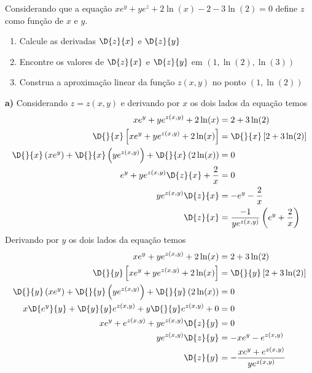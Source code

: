 \documentclass[a4paper,12pt,fleqn]{article}
\begin{document}

Considerando que a equação
\(
  xe^y + ye^z + 2\ln(x) -2 -3\ln(2) = 0
\)
define $z$ como função de $x$ e $y$.
\begin{enumerate}[label=\alph*)]
  \item Calcule as derivadas \(\D{z}{x}\) e \(\D{z}{y}\)
  \item Encontre os valores de \(\D{z}{x}\) e \(\D{z}{y}\) em \((1, \ln(2), \ln(3))\)
  \item Construa a aproximação linear da função $z(x, y)$ no ponto \((1, \ln(2))\)
\end{enumerate}
\clearpagequestiononly

\begin{answer}
  \vspace{\baselineskip}
  \textbf{a)\;}
  Considerando $z=z(x, y)$ e derivando por $x$ os dois lados da equação temos
  \begin{align*}
    xe^y + ye^{z(x, y)} + 2\ln(x) & = 2 +3\ln(2)  \\
    \D{}{x}\left[xe^y + ye^{z(x, y)} + 2\ln(x)\right] & = \D{}{x}\left[2 +3\ln(2)\right] \\
    \D{}{x}\left(xe^y\right) +
    \D{}{x}\left(ye^{z(x, y)}\right) +
    \D{}{x}\left(2\ln(x)\right)      & = 0 \\
    e^y + ye^{z(x, y)}\D{z}{x} + \frac{2}{x} & = 0 \\
    ye^{z(x, y)}\D{z}{x} & = -e^y - \frac{2}{x}  \\
    \D{z}{x}     & = \frac{-1}{ye^{z(x, y)}}\left(e^y + \frac{2}{x}\right)
  \end{align*}
  Derivando por $y$ os dois lados da equação temos
  \begin{align*}
    xe^y + ye^{z(x, y)} + 2\ln(x) & = 2 +3\ln(2) \\
    \D{}{y}\left[xe^y + ye^{z(x, y)} + 2\ln(x)\right] & = \D{}{y}\left[2 +3\ln(2)\right] \\
    \D{}{y}\left(xe^y\right) +
    \D{}{y}\left(ye^{z(x, y)}\right) +
    \D{}{y}\left(2\ln(x)\right) & = 0 \\
    x\D{e^y}{y} + \D{y}{y}e^{z(x, y)} + y\D{}{y}e^{z(x, y)} + 0 & = 0 \\
    xe^y + e^{z(x, y)} + ye^{z(x, y)}\D{z}{y} & = 0 \\
    ye^{z(x, y)}\D{z}{y} & = -xe^y - e^{z(x, y)} \\
    \D{z}{y} & = - \frac{xe^y + e^{z(x, y)}}{ye^{z(x, y)}}
  \end{align*}


\end{answer}
\end{document}
